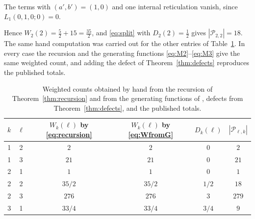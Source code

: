 \documentclass[11pt,a4paper]{article}
\theoremstyle{definition}
\newcommand{\cP}{\mathcal{P}}
\begin{document}
The terms with $(a',b')=(1,0)$ and one internal reticulation vanish, since $L_1(0,1,0;0)=0$.

Hence $W_2(2)=\tfrac52+15=\tfrac{35}{2}$, and \eqref{eq:split} with $D_2(2)=\tfrac12$ gives $|\cP_{2,2}|=18$. The same hand computation was carried out for the other entries of Table~\ref{tab:low}. In every case the recursion and the generating functions \eqref{eq:M2}--\eqref{eq:M3} give the same weighted count, and adding the defect of Theorem~\ref{thm:defects} reproduces the published totals.

\begin{table}[t]
\centering
\begin{tabular}{cccccc}
\toprule
$k$ & $\ell$ & $W_k(\ell)$ by \eqref{eq:recursion} & $W_k(\ell)$ by \eqref{eq:WfromG} & $D_k(\ell)$ & $|\cP_{\ell,k}|$ \cite{YuZhang26}\\
\midrule
1 & 2 & $2$ & $2$ & $0$ & $2$\\
1 & 3 & $21$ & $21$ & $0$ & $21$\\
2 & 1 & $1$ & $1$ & $0$ & $1$\\
2 & 2 & $35/2$ & $35/2$ & $1/2$ & $18$\\
2 & 3 & $276$ & $276$ & $3$ & $279$\\
3 & 1 & $33/4$ & $33/4$ & $3/4$ & $9$\\
\bottomrule
\end{tabular}
\caption{Weighted counts obtained by hand from the recursion of Theorem~\ref{thm:recursion} and from the generating functions of \cite{Mansouri22}, defects from Theorem~\ref{thm:defects}, and the published totals.}
\label{tab:low}
\end{table}
\end{document}
